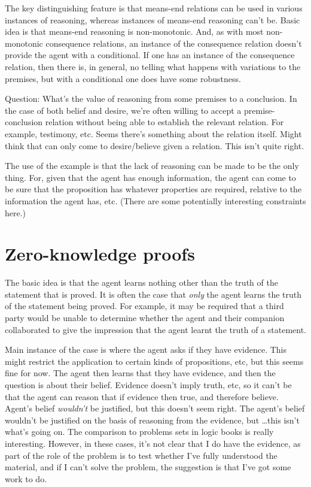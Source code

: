 \documentclass[10pt]{article}
\begin{document}
The key distinguishing feature is that means-end relations can be used in various instances of reasoning, whereas instances of means-end reasoning can't be.
Basic idea is that means-end reasoning is non-monotonic.
And, as with most non-monotonic consequence relations, an instance of the consequence relation doesn't provide the agent with a conditional.
If one has an instance of the consequence relation, then there is, in general, no telling what happens with variations to the premises, but with a conditional one does have some robustness.


Question: What's the value of reasoning from some premises to a conclusion.
In the case of both belief and desire, we're often willing to accept a premise-conclusion relation without being able to establish the relevant relation.
For example, testimony, etc.
Seems there's something about the relation itself.
Might think that can only come to desire/believe given a relation.
This isn't quite right.

The use of the example is that the lack of reasoning can be made to be the only thing.
For, given that the agent has enough information, the agent can come to be sure that the proposition has whatever properties are required, relative to the information the agent has, etc.
(There are some potentially interesting constraints here.)


\section{Zero-knowledge proofs}
\label{sec:zero-knowl-proofs}

The basic idea is that the agent learns nothing other than the truth of the statement that is proved.
It is often the case that \emph{only} the agent learns the truth of the statement being proved.
For example, it may be required that a third party would be unable to determine whether the agent and their companion collaborated to give the impression that the agent learnt the truth of a statement.

Main instance of the case is where the agent asks if they have evidence.
This might restrict the application to certain kinds of propositions, etc, but this seems fine for now.
The agent then learns that they have evidence, and then the question is about their belief.
Evidence doesn't imply truth, etc, so it can't be that the agent can reason that if evidence then true, and therefore believe.
Agent's belief \emph{wouldn't} be justified, but this doesn't seem right.
The agent's belief wouldn't be justified on the basis of reasoning from the evidence, but \dots this isn't what's going on.
The comparison to problems sets in logic books is really interesting.
However, in these cases, it's not clear that I do have the evidence, as part of the role of the problem is to test whether I've fully understood the material, and if I can't solve the problem, the suggestion is that I've got some work to do.
\end{document}
